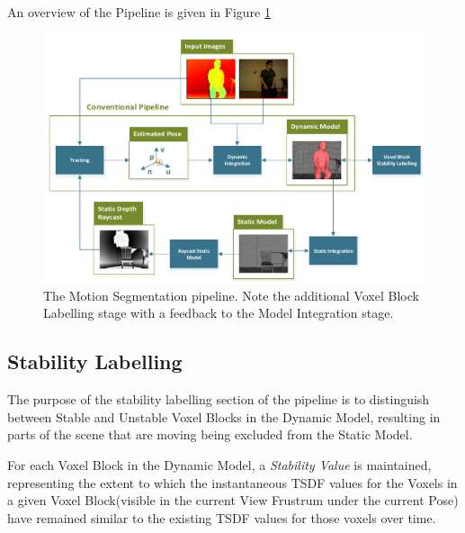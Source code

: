 An overview of the Pipeline is given in Figure \ref{fig:moseg_pipeline}
\begin{figure}[ht]
  \label{fig:moseg_pipeline}
  \centering
  \includegraphics[width=\linewidth]{figures/moseg/pipeline.pdf}
  \caption{The Motion Segmentation pipeline. Note the additional Voxel Block
    Labelling stage with a feedback to the Model Integration stage.}
\end{figure}

\subsection{Stability Labelling}
\label{sub:moseg_stability_labelling}
The purpose of the stability labelling section of the pipeline is to distinguish
between Stable and Unstable Voxel Blocks in the Dynamic Model, resulting in
parts of the scene that are moving being excluded from the Static Model.

For each Voxel Block in the Dynamic Model, a \emph{Stability Value} is
maintained, representing the extent to which the instantaneous TSDF values for
the Voxels in a given Voxel Block(visible in the current View Frustrum under the
current Pose) have remained similar to the existing TSDF values for those voxels
over time.

